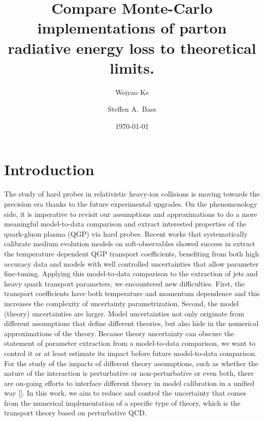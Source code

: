 \documentclass[aps, prc, reprint, amsmath, groupedaddress, nofootinbib]{revtex4-1}
\begin{document}
\title{Compare Monte-Carlo implementations of parton radiative energy loss to theoretical limits.}
\author{Weiyao Ke}
\author{Steffen A.\ Bass}
\date{\today}
\maketitle

\section{Introduction}
The study of hard probes in relativistic heavy-ion collisions is moving towards the precision era thanks to the future experimental upgrades.
On the phenomenology side, it is imperative to revisit our assumptions and approximations to do a more meaningful model-to-data comparison and extract interested properties of the quark-gluon plasma (QGP) via hard probes.
Recent works that systematically calibrate medium evolution models on soft-observables showed success in extract the temperature dependent QGP transport coefficients, benefiting from both high accuracy data and models with well controlled uncertainties that allow parameter fine-tuning.
Applying this model-to-data comparison to the extraction of jets and heavy quark transport parameters, we encountered new difficulties. 
First, the transport coefficients have both temperature and momentum dependence and this increases the complexity of uncertainty parametrization.
Second, the model (theory) uncertainties are larger. 
Model uncertainties not only originate from different assumptions that define different theories, but also hide in the numerical approximations of the theory.
Because theory uncertainty can obscure the statement of parameter extraction from a model-to-data comparison, we want to control it or at least estimate its impact before future model-to-data comparison.
For the study of the impacts of different theory assumptions, such as whether the nature of the interaction is perturbative or non-perturbative or even both, there are on-going efforts to interface different theory in model calibration in a unified way [].
In this work, we aim to reduce and control the uncertainty that comes from the numerical implementation of a specific type of theory, which is the transport theory based on perturbative QCD.
\end{document}
